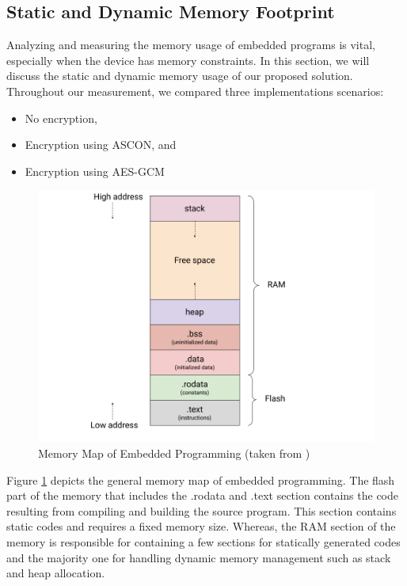 \subsection{Static and Dynamic Memory Footprint }
Analyzing and measuring the memory usage of embedded programs is vital, especially when the device has memory constraints. In this section, we will discuss the static and dynamic memory usage of our proposed solution. Throughout our measurement, we compared three implementations scenarios:
\begin{itemize}
    \item No encryption,
    \item Encryption using ASCON, and
    \item Encryption using AES-GCM
\end{itemize}

\begin{figure}[H]
    \centering
    \includegraphics[width=0.8\linewidth]{images/fp/memory-analysis.png}
    \caption{Memory Map of Embedded Programming (taken from \cite{koval_analyze_2020})}
    \label{fig:memory-map}
\end{figure}

Figure \ref{fig:memory-map} depicts the general memory map of embedded programming. The flash part of the memory that includes the .rodata and .text section contains the code resulting from compiling and building the source program. This section contains static codes and requires a fixed memory size. Whereas, the RAM section of the memory is responsible for containing a few sections for statically generated codes and the majority one for handling dynamic memory management such as stack and heap allocation.


